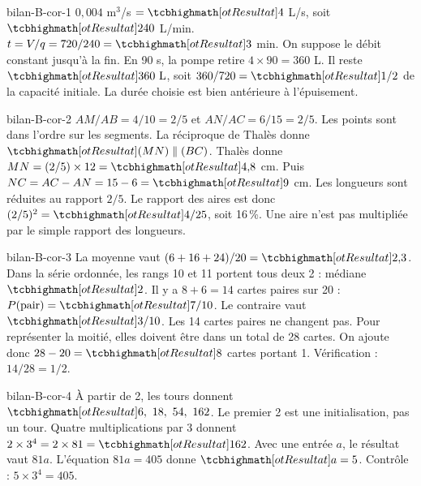 \begin{blocEdition}{bilan-B-cor-1}
$0{,}004$ m$^3$/s $=\res4$ L/s, soit $\res{240}$ L/min.
$t=V/q=720/240=\res3$ min. On suppose le débit constant jusqu’à la fin.
En 90 s, la pompe retire $4\times90=360$ L. Il reste $\res{360\ \mathrm L}$, soit $360/720=\res{1/2}$ de la capacité initiale. La durée choisie est bien antérieure à l’épuisement.
\end{blocEdition}
\begin{blocEdition}{bilan-B-cor-2}
$AM/AB=4/10=2/5$ et $AN/AC=6/15=2/5$. Les points sont dans l’ordre sur les segments. La réciproque de Thalès donne $\res{(MN)\parallel(BC)}$.
Thalès donne $MN=(2/5)\times12=\res{4{,}8}$ cm. Puis $NC=AC-AN=15-6=\res9$ cm.
Les longueurs sont réduites au rapport $2/5$. Le rapport des aires est donc $(2/5)^2=\res{4/25}$, soit 16\,\%. Une aire n’est pas multipliée par le simple rapport des longueurs.\label{fig-bilan-B-cor-2}

\end{blocEdition}
\begin{blocEdition}{bilan-B-cor-3}
La moyenne vaut $(6+16+24)/20=\res{2{,}3}$. Dans la série ordonnée, les rangs 10 et 11 portent tous deux 2 : médiane $\res2$.
Il y a $8+6=14$ cartes paires sur 20 : $P(\text{pair})=\res{7/10}$. Le contraire vaut $\res{3/10}$.
Les 14 cartes paires ne changent pas. Pour représenter la moitié, elles doivent être dans un total de 28 cartes. On ajoute donc $28-20=\res8$ cartes portant 1. Vérification : $14/28=1/2$.
\end{blocEdition}
\begin{blocEdition}{bilan-B-cor-4}
À partir de 2, les tours donnent $\res{6,\ 18,\ 54,\ 162}$. Le premier 2 est une initialisation, pas un tour.
Quatre multiplications par 3 donnent $2\times3^4=2\times81=\res{162}$.
Avec une entrée $a$, le résultat vaut $81a$. L’équation $81a=405$ donne $\res{a=5}$. Contrôle : $5\times3^4=405$.\label{fig-bilan-B-cor-4}

\end{blocEdition}
